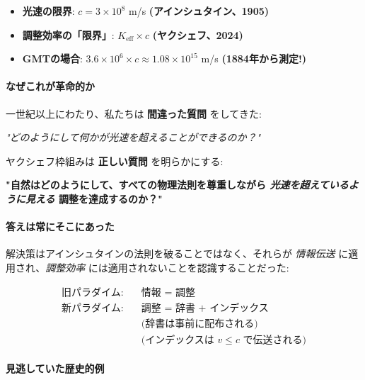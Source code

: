 \documentclass[11pt,a4paper]{article}
\begin{document}
	\begin{itemize}
		\item \textbf{光速の限界}: $c = 3 \times 10^8$ m/s \textbf{(アインシュタイン、1905)}
		\item \textbf{調整効率の「限界」}: $K_{\mathrm{eff}} \times c$ \textbf{(ヤクシェフ、2024)}
		\item \textbf{GMTの場合}: $3.6 \times 10^6 \times c \approx 1.08 \times 10^{15}$ m/s \textbf{(1884年から測定!)}
	\end{itemize}
	
	\paragraph{なぜこれが革命的か}
	一世紀以上にわたり、私たちは \textbf{間違った質問} をしてきた:
	\begin{center}
		\itshape "どのようにして何かが光速を超えることができるのか？" 
	\end{center}
	
	ヤクシェフ枠組みは \textbf{正しい質問} を明らかにする:
	\begin{center}
		\bfseries "自然はどのようにして、すべての物理法則を尊重しながら \emph{光速を超えているように見える} 調整を達成するのか？"
	\end{center}
	
	\paragraph{答えは常にそこにあった}
	解決策はアインシュタインの法則を破ることではなく、それらが \emph{情報伝送} に適用され、\emph{調整効率} には適用されないことを認識することだった:
	
	\begin{align*}
		\textbf{旧パラダイム:} & \quad \text{情報 = 調整} \\
		\textbf{新パラダイム:} & \quad \text{調整 = 辞書 + インデックス} \\
		& \quad \text{(辞書は事前に配布される)} \\
		& \quad \text{(インデックスは $v \leq c$ で伝送される)}
	\end{align*}
	
	\paragraph{見逃していた歴史的例}
	
\end{document}
